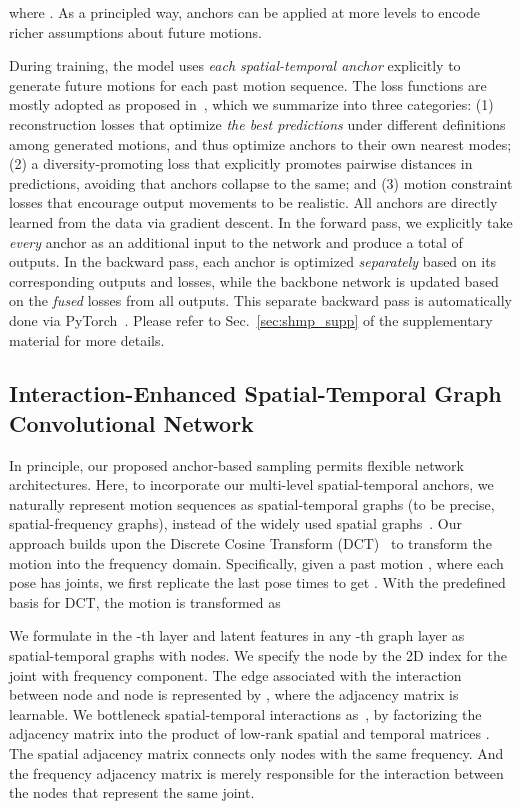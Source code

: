 where . As a principled way, anchors can be applied at more levels to encode richer assumptions about future motions.
 
During training, the model uses \textit{each spatial-temporal anchor} explicitly to generate  future motions for each past motion sequence. The loss functions are mostly adopted as proposed in~\cite{mao2021generating}, which we summarize into three categories: (1) reconstruction losses that optimize \textit{the best predictions} under different definitions among  generated motions, and thus optimize anchors to their own nearest modes; (2) a diversity-promoting loss that explicitly promotes pairwise distances in predictions, avoiding that anchors collapse to the same; and (3) motion constraint losses that encourage output movements to be realistic. All anchors are directly learned from the data via gradient descent.
In the forward pass, we explicitly take {\em every} anchor  as an additional input to the network and produce a total of  outputs. In the backward pass, each anchor is optimized \textit{separately} based on its corresponding outputs and losses, while the backbone network is updated based on the \textit{fused} losses from all outputs. This separate backward pass is automatically done via PyTorch~\cite{paszke2019pytorch}. Please refer to Sec.~\ref{sec:shmp_supp} of the supplementary material for more details.

\subsection{Interaction-Enhanced Spatial-Temporal Graph Convolutional Network}\label{sec:network}
In principle, our proposed anchor-based sampling permits flexible network architectures. Here, to incorporate our multi-level spatial-temporal anchors, we naturally represent motion sequences as spatial-temporal graphs (to be precise,  spatial-frequency graphs), instead of the widely used spatial graphs~\cite{wei2019motion,mao2021generating}.  Our approach builds upon the Discrete Cosine Transform (DCT)~\cite{wei2019motion,mao2021generating} to transform the motion into the frequency domain. Specifically, given a past motion , where each pose has  joints, we first replicate the last pose  times to get . With the predefined  basis  for DCT, the motion is transformed as


We formulate  in the -th layer and latent features in any -th graph layer as spatial-temporal graphs  with  nodes. We specify the node  by the 2D index  for the joint  with frequency  component. The edge  associated with the interaction between node  and node  is represented by , where the adjacency matrix  is learnable. We bottleneck spatial-temporal interactions as~\cite{Sofianos_2021_ICCV}, by factorizing the adjacency matrix into the product of low-rank spatial and temporal matrices . The spatial adjacency matrix  connects only nodes with the same frequency. And the frequency adjacency matrix  is merely responsible for the interaction between the nodes that represent the same joint.



